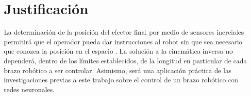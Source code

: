 \section{Justificación}

La determinación de la posición del efector final por medio de sensores inerciales permitirá que el operador pueda dar instrucciones al robot sin que sea necesario que conozca la posición en el espacio . La solución a la cinemática inversa no dependerá, dentro de los límites establecidos, de la longitud en particular de cada brazo robótico a ser controlar. Asimismo, será una aplicación práctica de las investigaciones previas a este trabajo sobre el control de un brazo robótico con redes neuronales.